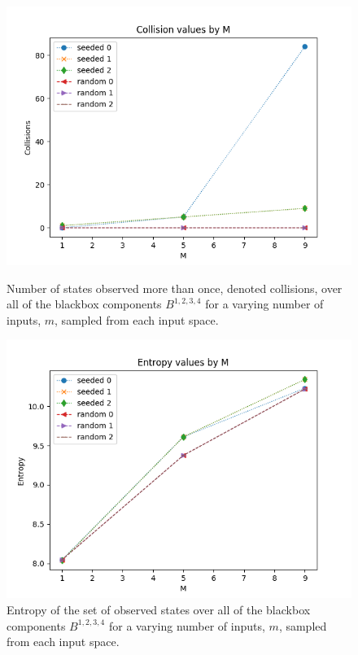\documentclass[letterpaper,twocolumn,10pt]{article}
\begin{document}
\begin{figure} 
\includegraphics[width=\linewidth]{figs/collisions_0.png}
\caption{\label{fig:col0} Number of states observed more than once, denoted collisions, over all of the blackbox components $B^{1,2,3,4}$ for a varying number of inputs, $m$, sampled from each input space.}

\includegraphics[width=\linewidth]{figs/entropy_0.png}
\caption{\label{fig:ent0} Entropy of the set of observed states over all of the blackbox components $B^{1,2,3,4}$ for a varying number of inputs, $m$, sampled from each input space.}
\end{figure}

\end{document}
